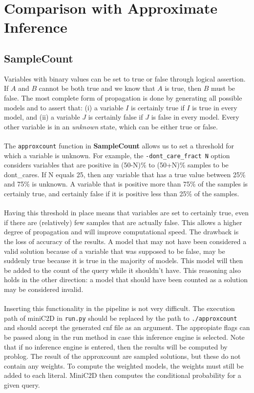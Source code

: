 \section{Comparison with Approximate Inference}

\subsection{SampleCount}

Variables with binary values can be set to true or false through logical assertion. If $A$ and $B$ cannot be both true and we know that $A$ is true, then $B$ must be false. The most complete form of propagation is done by generating all possible models and to assert that: (i) a variable $I$ is certainly true if $I$ is true in every model, and (ii) a variable $J$ is certainly false if $J$ is false in every model. Every other variable is in an \textit{unknown} state, which can be either true or false.
\\\\
The \texttt{approxcount} function in \textbf{SampleCount} allows us to set a threshold for which a variable is unknown. For example, the \texttt{-dont\_care\_fract N} option considers variables that are positive in (50-N)\% to (50+N)\% samples to be dont_cares. If N equals 25, then any variable that has a true value between 25\% and 75\% is unknown. A variable that is positive more than 75\% of the samples is certainly true, and certainly false if it is positive less than 25\% of the samples.
\\\\
Having this threshold in place means that variables are set to certainly true, even if there are (relatively) few samples that are actually false. This allows a higher degree of propagation and will improve computational speed. The drawback is the loss of accuracy of the results. A model that may not have been considered a valid solution because of a variable that was supposed to be false, may be suddenly true because it is true in the majority of models. This model will then be added to the count of the query while it shouldn't have. This reasoning also holds in the other direction: a model that should have been counted as a solution may be considered invalid.
\\\\
Inserting this functionality in the pipeline is not very difficult. The execution path of miniC2D in \texttt{run.py} should be replaced by the path to \texttt{./approxcount} and should accept the generated cnf file as an argument. The appropiate flags can be passed along in the run method in case this inference engine is selected. Note that if no inference engine is entered, then the results will be computed by problog. The result of the approxcount are sampled solutions, but these do not contain any weights. To compute the weighted models, the weights must still be added to each literal. MiniC2D then computes the conditional probability for a given query.


